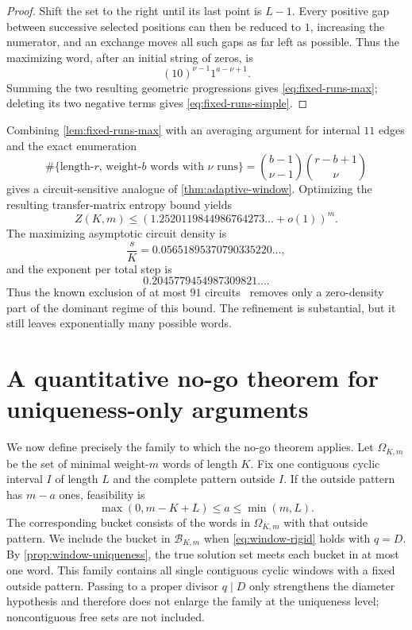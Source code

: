 \documentclass[11pt]{amsart}
\numberwithin{equation}{section}
\begin{document}
\begin{proof}
Shift the set to the right until its last point is $L-1$.  Every positive gap between successive selected positions can then be reduced to $1$, increasing the numerator, and an exchange moves all such gaps as far left as possible.  Thus the maximizing word, after an initial string of zeros, is
\[
(10)^{\nu-1}1^{a-\nu+1}.
\]
Summing the two resulting geometric progressions gives \eqref{eq:fixed-runs-max}; deleting its two negative terms gives \eqref{eq:fixed-runs-simple}.
\end{proof}

Combining \cref{lem:fixed-runs-max} with an averaging argument for internal $11$ edges and the exact enumeration
\begin{equation}\label{eq:linear-runs-count}
\#\{\text{length-$r$, weight-$b$ words with $\nu$ runs}\}
=\binom{b-1}{\nu-1}\binom{r-b+1}{\nu}
\end{equation}
gives a circuit-sensitive analogue of \cref{thm:adaptive-window}.  Optimizing the resulting transfer-matrix entropy bound yields
\begin{equation}\label{eq:base-125}
Z(K,m)
\le
\left(1.2520119844986764273\ldots+o(1)\right)^m.
\end{equation}
The maximizing asymptotic circuit density is
\[
\frac{s}{K}
=0.05651895370790335220\ldots,
\]
and the exponent per total step is
\[
0.2045779454987309821\ldots.
\]
Thus the known exclusion of at most $91$ circuits~\cite{Hercher2023} removes only a zero-density part of the dominant regime of this bound.  The refinement is substantial, but it still leaves exponentially many possible words.

\section{A quantitative no-go theorem for uniqueness-only arguments}\label{sec:no-go}

We now define precisely the family to which the no-go theorem applies.  Let $\Omega_{K,m}$ be the set of minimal weight-$m$ words of length $K$.  Fix one contiguous cyclic interval $I$ of length $L$ and the complete pattern outside $I$.  If the outside pattern has $m-a$ ones, feasibility is
\begin{equation}\label{eq:feasible-a}
\max(0,m-K+L)\le a\le\min(m,L).
\end{equation}
The corresponding bucket consists of the words in $\Omega_{K,m}$ with that outside pattern.  We include the bucket in $\mathcal B_{K,m}$ when \eqref{eq:window-rigid} holds with $q=D$.  By \cref{prop:window-uniqueness}, the true solution set meets each bucket in at most one word.
This family contains all single contiguous cyclic windows with a fixed outside pattern.  Passing to a proper divisor $q\mid D$ only strengthens the diameter hypothesis and therefore does not enlarge the family at the uniqueness level; noncontiguous free sets are not included.
\end{document}
